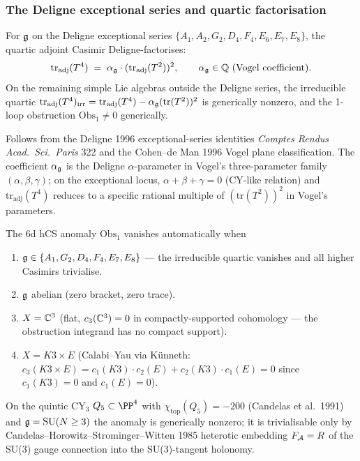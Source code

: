 \subsubsection{The Deligne exceptional series and quartic factorisation}

\begin{theorem}\ClaimStatusTheorem
\label{opus13:thm:deligne-vanishing}
For $\mathfrak{g}$ on the Deligne exceptional series
$\{A_1, A_2, G_2, D_4, F_4, E_6, E_7, E_8\}$, the quartic adjoint
Casimir Deligne-factorises:
\begin{equation}
  \mathrm{tr}_{\mathrm{adj}}(T^4) \;=\; \alpha_{\mathfrak{g}}\cdot
  (\mathrm{tr}_{\mathrm{adj}}(T^2))^2,
  \qquad
  \alpha_{\mathfrak{g}} \in \mathbb{Q} \text{ (Vogel coefficient).}
  \label{opus13:eq:deligne-factorisation}
\end{equation}
On the remaining simple Lie algebras outside the Deligne series, the
irreducible quartic
$\mathrm{tr}_{\mathrm{adj}}(T^4)_{\mathrm{irr}} =
\mathrm{tr}_{\mathrm{adj}}(T^4) - \alpha_{\mathfrak{g}}(\mathrm{tr}(T^2))^2$
is generically nonzero, and the 1-loop obstruction
$\mathrm{Obs}_1 \neq 0$ generically.
\end{theorem}

\begin{proof-sketch}
Follows from the Deligne 1996 exceptional-series identities
\emph{Comptes Rendus Acad.\ Sci.\ Paris} 322 and the Cohen--de Man 1996
Vogel plane classification. The coefficient $\alpha_{\mathfrak{g}}$ is the
Deligne $\alpha$-parameter in Vogel's three-parameter family
$(\alpha,\beta,\gamma)$; on the exceptional locus,
$\alpha+\beta+\gamma = 0$ (CY-like relation) and
$\mathrm{tr}_{\mathrm{adj}}(T^4)$ reduces to a specific rational multiple
of $(\mathrm{tr}(T^2))^2$ in Vogel's parameters.
\end{proof-sketch}

\begin{corollary}\ClaimStatusCorollary
\label{opus13:cor:anom-free}
The 6d hCS anomaly $\mathrm{Obs}_1$ vanishes automatically when
\begin{enumerate}
\item $\mathfrak{g} \in \{A_1, G_2, D_4, F_4, E_7, E_8\}$ — the irreducible
  quartic vanishes and all higher Casimirs trivialise.
\item $\mathfrak{g}$ abelian (zero bracket, zero trace).
\item $X = \mathbb{C}^3$ (flat, $c_3(\mathbb{C}^3) = 0$ in compactly-supported
  cohomology — the obstruction integrand has no compact support).
\item $X = K3 \times E$ (Calabi--Yau via Künneth: $c_3(K3\times E) =
  c_1(K3)\cdot c_2(E) + c_2(K3)\cdot c_1(E) = 0$ since $c_1(K3) = 0$
  and $c_1(E) = 0$).
\end{enumerate}
On the quintic CY$_3$ $Q_5 \subset \PP^4$ with $\chi_{\mathrm{top}}(Q_5)
= -200$ (Candelas et al.\ 1991) and $\mathfrak{g} = \mathrm{SU}(N\geq 3)$ the
anomaly is generically nonzero; it is trivialisable only by
Candelas--Horowitz--Strominger--Witten 1985 heterotic embedding
$F_{\mathcal{A}} = R$ of the SU(3) gauge connection into the SU(3)-tangent
holonomy.
\end{corollary}


